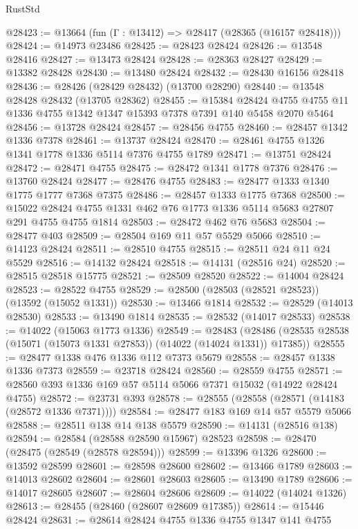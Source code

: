 \begin{lexlean}{RustStd}
\begin{coremodule}
@28423 := @13664 (fun (Γ : @13412) => @28417 (@28365 (@16157 @28418)))
@28424 := @14973 @23486
@28425 := @28423 @28424
@28426 := @13548 @28416
@28427 := @13473 @28424
@28428 := @28363 @28427
@28429 := @13382 @28428
@28430 := @13480 @28424
@28432 := @28430 @16156 @28418
@28436 := @28426 (@28429 @28432) (@13700 @28290)
@28440 := @13548 @28428 @28432 (@13705 @28362)
@28455 := @15384
    @28424
    @4755
    @4755
    @11
    @1336
    @4755
    @1342
    @1347
    @15393
    @7378
    @7391
    @140
    @5458
    @2070
    @5464
@28456 := @13728 @28424
@28457 := @28456 @4755
@28460 := @28457 @1342 @1336 @7378
@28461 := @13737 @28424
@28470 := @28461 @4755 @1326 @1341 @1778 @1336 @5114 @7376 @4755 @1789
@28471 := @13751 @28424
@28472 := @28471 @4755
@28475 := @28472 @1341 @1778 @7376
@28476 := @13760 @28424
@28477 := @28476 @4755
@28483 := @28477 @1333 @1340 @1775 @1777 @7368 @7375
@28486 := @28457 @1333 @1775 @7368
@28500 := @15022 @28424 @4755 @1331 @462 @76 @1773 @1336 @5114 @5683 @27807 @291 @4755 @4755 @1814
@28503 := @28472 @462 @76 @5683
@28504 := @28477 @403
@28509 := @28504 @169 @11 @57 @5529 @5066
@28510 := @14123 @28424
@28511 := @28510 @4755
@28515 := @28511 @24 @11 @24 @5529
@28516 := @14132 @28424
@28518 := @14131 (@28516 @24)
@28520 := @28515 @28518 @15775
@28521 := @28509 @28520
@28522 := @14004 @28424
@28523 := @28522 @4755
@28529 := @28500 (@28503 (@28521 @28523)) (@13592 (@15052 @1331))
@28530 := @13466 @1814
@28532 := @28529 (@14013 @28530)
@28533 := @13490 @1814
@28535 := @28532 (@14017 @28533)
@28538 := @14022 (@15063 @1773 @1336)
@28549 := @28483
    (@28486 (@28535 @28538 (@15071 (@15073 @1331 @27853)) (@14022 (@14024 @1331)) @17385))
@28555 := @28477 @1338 @476 @1336 @112 @7373 @5679
@28558 := @28457 @1338 @1336 @7373
@28559 := @23718 @28424
@28560 := @28559 @4755
@28571 := @28560 @393 @1336 @169 @57 @5114 @5066 @7371 @15032 (@14922 @28424 @4755)
@28572 := @23731 @393
@28578 := @28555 (@28558 (@28571 (@14183 (@28572 @1336 @7371))))
@28584 := @28477 @183 @169 @14 @57 @5579 @5066
@28588 := @28511 @138 @14 @138 @5579
@28590 := @14131 (@28516 @138)
@28594 := @28584 (@28588 @28590 @15967) @28523
@28598 := @28470 (@28475 (@28549 (@28578 @28594)))
@28599 := @13396 @1326
@28600 := @13592 @28599
@28601 := @28598 @28600
@28602 := @13466 @1789
@28603 := @14013 @28602
@28604 := @28601 @28603
@28605 := @13490 @1789
@28606 := @14017 @28605
@28607 := @28604 @28606
@28609 := @14022 (@14024 @1326)
@28613 := @28455 (@28460 (@28607 @28609 @17385))
@28614 := @15446 @28424
@28631 := @28614
    @28424
    @4755
    @1336
    @4755
    @1347
    @141
    @4755

\end{coremodule}
\end{lexlean}
